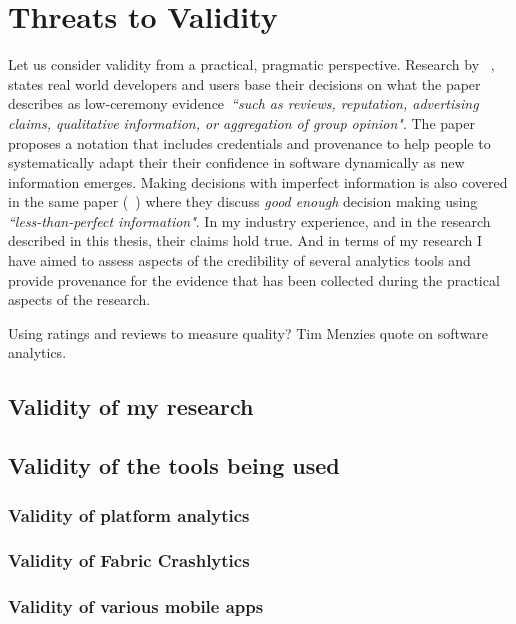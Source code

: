 \section{Threats to Validity}

Let us consider validity from a practical, pragmatic perspective. 
Research by ~\cite{scaffidi2007developing}, states real world developers and users base their decisions on what the paper describes as low-ceremony evidence~\emph{``such as reviews, reputation, advertising claims, qualitative information, or aggregation of group opinion"}. The paper proposes a notation that includes credentials and provenance to help people to systematically adapt their their confidence in software dynamically as new information emerges. Making decisions with imperfect information is also covered in the same paper (~\cite{scaffidi2007developing}) where they discuss \emph{good enough} decision making using \emph{``less-than-perfect information"}. In my industry experience, and in the research described in this thesis, their claims hold true. And in terms of my research I have aimed to assess aspects of the credibility of several analytics tools and provide provenance for the evidence that has been collected during the practical aspects of the research.

Using ratings and reviews to measure quality? Tim Menzies quote on software analytics. 

\subsection{Validity of my research}



\subsection{Validity of the tools being used}

\subsubsection{Validity of platform analytics}

\subsubsection{Validity of Fabric Crashlytics}

\subsubsection{Validity of various mobile apps}

